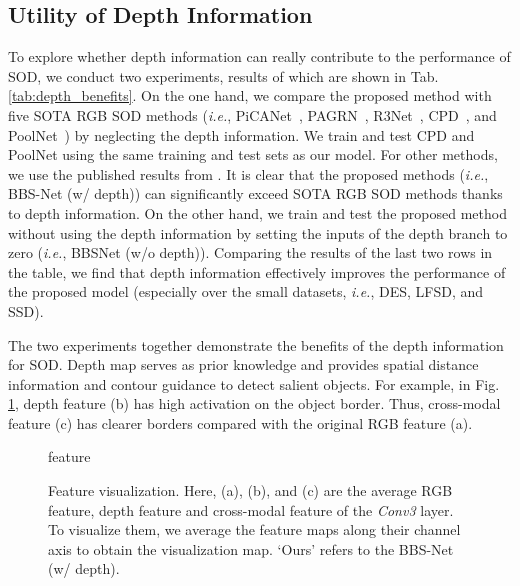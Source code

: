 \documentclass[journal]{IEEEtran}
\newcommand{\tabref}[1]{Tab. \ref{#1}}
\newcommand{\figref}[1]{Fig. \ref{#1}}
\def\ie{\emph{i.e.}}
\begin{document}
\subsection{Utility of Depth Information}\label{sec:depth_benefits}
To explore whether depth information can really contribute to the performance of SOD, we conduct two experiments, results of which are shown in \tabref{tab:depth_benefits}.
On the one hand, we compare the proposed method with five SOTA RGB SOD methods (\ie, PiCANet~\cite{Liu_2018_PiCAN}, PAGRN~\cite{Zhang2018PAGR}, R3Net~\cite{deng2018r3net}, CPD~\cite{Wu2019CPD}, and PoolNet~\cite{Liu2019SPBD}) by neglecting the depth information.
We train and test CPD and PoolNet using the same training and test sets as our model.
For other methods, we use the published results from \cite{piao2019DMRA}.
It is clear that the proposed methods (\ie, BBS-Net (w/ depth)) can significantly exceed SOTA RGB SOD methods thanks to depth information.
On the other hand, we train and test the proposed method without using the depth information by setting the inputs of the depth branch to zero (\ie, BBSNet (w/o depth)).
Comparing the results of the last two rows in the table, we find that depth information effectively improves the performance of the proposed model (especially over the small datasets, \ie, DES, LFSD, and SSD).\par
The two experiments together demonstrate the benefits of the depth information for SOD.
Depth map serves as prior knowledge and provides spatial distance information and contour guidance to detect salient objects.
For example, in \figref{fig:feature}, depth feature (b) has high activation on the object border.
Thus, cross-modal feature (c) has clearer borders compared with the original RGB feature (a).
\begin{figure}[t!]
	\centering	
	\begin{overpic}[width=1.0\linewidth]{feature}
	\end{overpic}
	\vspace{-20pt}
	\caption{ Feature visualization. Here, (a), (b), and (c) are the average RGB feature, depth feature and cross-modal feature of the \textit{Conv3} layer. To visualize them, we average the
		feature maps along their channel axis to obtain the visualization map. `Ours' refers to the BBS-Net (w/ depth).}
	\label{fig:feature}
\end{figure}
\end{document}
